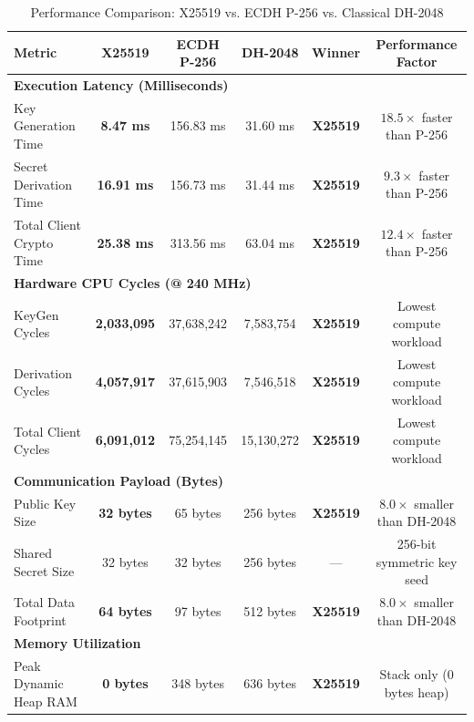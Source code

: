 \documentclass[11pt,a4paper]{article}
\begin{document}
\begin{table}[htbp]
\centering
\small
\setlength{\tabcolsep}{3.2pt}
\caption{Performance Comparison: X25519 vs. ECDH P-256 vs. Classical DH-2048}
\label{tab:comparison_summary}
\begin{tabular}{l c c c c c}
\toprule
\textbf{Metric} & \textbf{X25519} & \textbf{ECDH P-256} & \textbf{DH-2048} & \textbf{Winner} & \textbf{Performance Factor} \\
\midrule
\multicolumn{6}{l}{\textbf{Execution Latency (Milliseconds)}} \\
Key Generation Time     & \textbf{8.47 ms}   & 156.83 ms & 31.60 ms & \textbf{X25519} & $18.5\times$ faster than P-256 \\
Secret Derivation Time  & \textbf{16.91 ms}  & 156.73 ms & 31.44 ms & \textbf{X25519} & $9.3\times$ faster than P-256 \\
Total Client Crypto Time& \textbf{25.38 ms}  & 313.56 ms & 63.04 ms & \textbf{X25519} & $12.4\times$ faster than P-256 \\
\midrule
\multicolumn{6}{l}{\textbf{Hardware CPU Cycles (@ 240 MHz)}} \\
KeyGen Cycles           & \textbf{2,033,095} & 37,638,242 & 7,583,754 & \textbf{X25519} & Lowest compute workload \\
Derivation Cycles       & \textbf{4,057,917} & 37,615,903 & 7,546,518 & \textbf{X25519} & Lowest compute workload \\
Total Client Cycles     & \textbf{6,091,012} & 75,254,145 & 15,130,272 & \textbf{X25519} & Lowest compute workload \\
\midrule
\multicolumn{6}{l}{\textbf{Communication Payload (Bytes)}} \\
Public Key Size         & \textbf{32 bytes}  & 65 bytes   & 256 bytes & \textbf{X25519} & $8.0\times$ smaller than DH-2048 \\
Shared Secret Size      & 32 bytes           & 32 bytes   & 256 bytes & ---             & 256-bit symmetric key seed \\
Total Data Footprint    & \textbf{64 bytes}  & 97 bytes   & 512 bytes & \textbf{X25519} & $8.0\times$ smaller than DH-2048 \\
\midrule
\multicolumn{6}{l}{\textbf{Memory Utilization}} \\
Peak Dynamic Heap RAM   & \textbf{0 bytes}   & 348 bytes  & 636 bytes & \textbf{X25519} & Stack only (0 bytes heap) \\
\bottomrule
\end{tabular}
\end{table}
\end{document}
